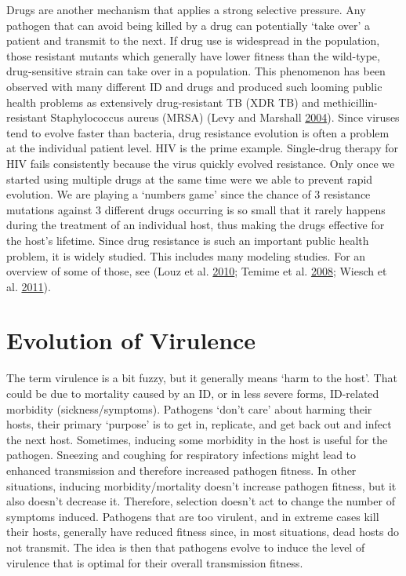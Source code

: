\documentclass[]{book}
\theoremstyle{definition}
\theoremstyle{definition}
\theoremstyle{definition}
\theoremstyle{remark}
\begin{document}
Drugs are another mechanism that applies a strong selective pressure.
Any pathogen that can avoid being killed by a drug can potentially `take
over' a patient and transmit to the next. If drug use is widespread in
the population, those resistant mutants which generally have lower
fitness than the wild-type, drug-sensitive strain can take over in a
population. This phenomenon has been observed with many different ID and
drugs and produced such looming public health problems as extensively
drug-resistant TB (XDR TB) and methicillin-resistant Staphylococcus
aureus (MRSA) (Levy and Marshall \protect\hyperlink{ref-levy04}{2004}).
Since viruses tend to evolve faster than bacteria, drug resistance
evolution is often a problem at the individual patient level. HIV is the
prime example. Single-drug therapy for HIV fails consistently because
the virus quickly evolved resistance. Only once we started using
multiple drugs at the same time were we able to prevent rapid evolution.
We are playing a `numbers game' since the chance of 3 resistance
mutations against 3 different drugs occurring is so small that it rarely
happens during the treatment of an individual host, thus making the
drugs effective for the host's lifetime. Since drug resistance is such
an important public health problem, it is widely studied. This includes
many modeling studies. For an overview of some of those, see (Louz et
al. \protect\hyperlink{ref-louz10}{2010}; Temime et al.
\protect\hyperlink{ref-temime08}{2008}; Wiesch et al.
\protect\hyperlink{ref-wiesch11}{2011}).

\section{Evolution of Virulence}\label{evolution-of-virulence}

The term virulence is a bit fuzzy, but it generally means `harm to the
host'. That could be due to mortality caused by an ID, or in less severe
forms, ID-related morbidity (sickness/symptoms). Pathogens `don't care'
about harming their hosts, their primary `purpose' is to get in,
replicate, and get back out and infect the next host. Sometimes,
inducing some morbidity in the host is useful for the pathogen. Sneezing
and coughing for respiratory infections might lead to enhanced
transmission and therefore increased pathogen fitness. In other
situations, inducing morbidity/mortality doesn't increase pathogen
fitness, but it also doesn't decrease it. Therefore, selection doesn't
act to change the number of symptoms induced. Pathogens that are too
virulent, and in extreme cases kill their hosts, generally have reduced
fitness since, in most situations, dead hosts do not transmit. The idea
is then that pathogens evolve to induce the level of virulence that is
optimal for their overall transmission fitness.
\end{document}
